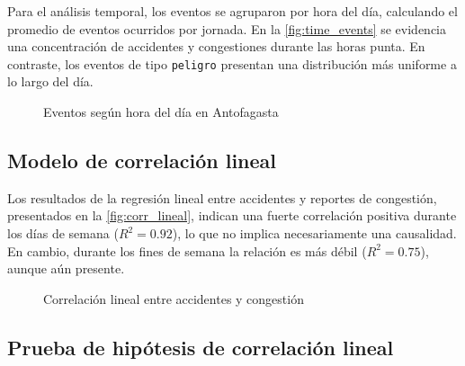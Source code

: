 \documentclass[12pt]{article}
\begin{document}
Para el análisis temporal, los eventos se agruparon por hora del día, calculando el promedio de eventos ocurridos por jornada. En la \autoref{fig:time_events} se evidencia una concentración de accidentes y congestiones durante las horas punta. En contraste, los eventos de tipo \texttt{peligro} presentan una distribución más uniforme a lo largo del día.

\begin{figure}[H]
    \centering
    \newline
    \newline
    \newline
    \caption{Eventos según hora del día en Antofagasta}
    \label{fig:time_events}
\end{figure}

\subsection{Modelo de correlación lineal}

Los resultados de la regresión lineal entre accidentes y reportes de congestión, presentados en la \autoref{fig:corr_lineal}, indican una fuerte correlación positiva durante los días de semana ($R^2 = 0.92$), lo que no implica necesariamente una causalidad. En cambio, durante los fines de semana la relación es más débil ($R^2 = 0.75$), aunque aún presente.


\begin{figure}[H]
    \centering
    \newline
    \newline
    \caption{Correlación lineal entre accidentes y congestión}
    \label{fig:corr_lineal}
\end{figure}

\subsection{Prueba de hipótesis de correlación lineal}
\end{document}

